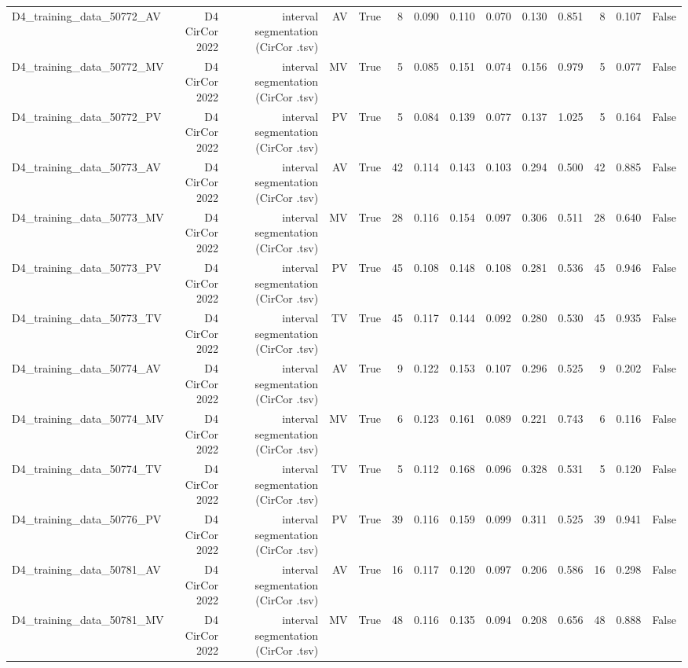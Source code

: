\begin{table}[htbp]
\begin{tabular}{lrrrrrrrrrrrrr}
    D4\_training\_data\_50772\_AV & D4 CirCor 2022 & interval segmentation (CirCor .tsv) & AV & True & 8 & 0.090 & 0.110 & 0.070 & 0.130 & 0.851 & 8 & 0.107 & False \\
    D4\_training\_data\_50772\_MV & D4 CirCor 2022 & interval segmentation (CirCor .tsv) & MV & True & 5 & 0.085 & 0.151 & 0.074 & 0.156 & 0.979 & 5 & 0.077 & False \\
    D4\_training\_data\_50772\_PV & D4 CirCor 2022 & interval segmentation (CirCor .tsv) & PV & True & 5 & 0.084 & 0.139 & 0.077 & 0.137 & 1.025 & 5 & 0.164 & False \\
    D4\_training\_data\_50773\_AV & D4 CirCor 2022 & interval segmentation (CirCor .tsv) & AV & True & 42 & 0.114 & 0.143 & 0.103 & 0.294 & 0.500 & 42 & 0.885 & False \\
    D4\_training\_data\_50773\_MV & D4 CirCor 2022 & interval segmentation (CirCor .tsv) & MV & True & 28 & 0.116 & 0.154 & 0.097 & 0.306 & 0.511 & 28 & 0.640 & False \\
    D4\_training\_data\_50773\_PV & D4 CirCor 2022 & interval segmentation (CirCor .tsv) & PV & True & 45 & 0.108 & 0.148 & 0.108 & 0.281 & 0.536 & 45 & 0.946 & False \\
    D4\_training\_data\_50773\_TV & D4 CirCor 2022 & interval segmentation (CirCor .tsv) & TV & True & 45 & 0.117 & 0.144 & 0.092 & 0.280 & 0.530 & 45 & 0.935 & False \\
    D4\_training\_data\_50774\_AV & D4 CirCor 2022 & interval segmentation (CirCor .tsv) & AV & True & 9 & 0.122 & 0.153 & 0.107 & 0.296 & 0.525 & 9 & 0.202 & False \\
    D4\_training\_data\_50774\_MV & D4 CirCor 2022 & interval segmentation (CirCor .tsv) & MV & True & 6 & 0.123 & 0.161 & 0.089 & 0.221 & 0.743 & 6 & 0.116 & False \\
    D4\_training\_data\_50774\_TV & D4 CirCor 2022 & interval segmentation (CirCor .tsv) & TV & True & 5 & 0.112 & 0.168 & 0.096 & 0.328 & 0.531 & 5 & 0.120 & False \\
    D4\_training\_data\_50776\_PV & D4 CirCor 2022 & interval segmentation (CirCor .tsv) & PV & True & 39 & 0.116 & 0.159 & 0.099 & 0.311 & 0.525 & 39 & 0.941 & False \\
    D4\_training\_data\_50781\_AV & D4 CirCor 2022 & interval segmentation (CirCor .tsv) & AV & True & 16 & 0.117 & 0.120 & 0.097 & 0.206 & 0.586 & 16 & 0.298 & False \\
    D4\_training\_data\_50781\_MV & D4 CirCor 2022 & interval segmentation (CirCor .tsv) & MV & True & 48 & 0.116 & 0.135 & 0.094 & 0.208 & 0.656 & 48 & 0.888 & False \\

\end{tabular}
\end{table}

